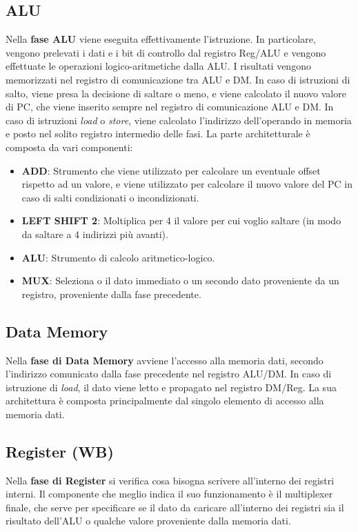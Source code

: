\subsection{ALU}
Nella \textbf{fase ALU} viene eseguita effettivamente l'istruzione. In particolare, vengono prelevati i dati e i bit di controllo dal registro Reg/ALU e vengono effettuate le operazioni logico-aritmetiche dalla ALU. I risultati vengono memorizzati nel registro di comunicazione tra ALU e DM. In caso di istruzioni di salto, viene presa la decisione di saltare o meno, e viene calcolato il nuovo valore di PC, che viene inserito sempre nel registro di comunicazione ALU e DM. In caso di istruzioni \textit{load} o \textit{store}, viene calcolato l'indirizzo dell'operando in memoria e posto nel solito registro intermedio delle fasi. 
La parte architetturale è composta da vari componenti:
\begin{itemize}
    \item \textbf{ADD}: Strumento che viene utilizzato per calcolare un eventuale offset rispetto ad un valore, e viene utilizzato per calcolare il nuovo valore del PC in caso di salti condizionati o incondizionati.
    \item \textbf{LEFT SHIFT 2}: Moltiplica per 4 il valore per cui voglio saltare (in modo da saltare a 4 indirizzi più avanti).
    \item \textbf{ALU}: Strumento di calcolo aritmetico-logico.
    \item \textbf{MUX}: Seleziona o il dato immediato o un secondo dato proveniente da un registro, proveniente dalla fase precedente.
\end{itemize}

\subsection{Data Memory}
Nella \textbf{fase di Data Memory} avviene l'accesso alla memoria dati, secondo l'indirizzo comunicato dalla fase precedente nel registro ALU/DM. In caso di istruzione di \textit{load}, il dato viene letto e propagato nel registro DM/Reg. La sua architettura è composta principalmente dal singolo elemento di accesso alla memoria dati.

\subsection{Register (WB)}
Nella \textbf{fase di Register} si verifica cosa bisogna scrivere all'interno dei registri interni. Il componente che meglio indica il suo funzionamento è il multiplexer finale, che serve per specificare se il dato da caricare all'interno dei registri sia il risultato dell'ALU o qualche valore proveniente dalla memoria dati. 

